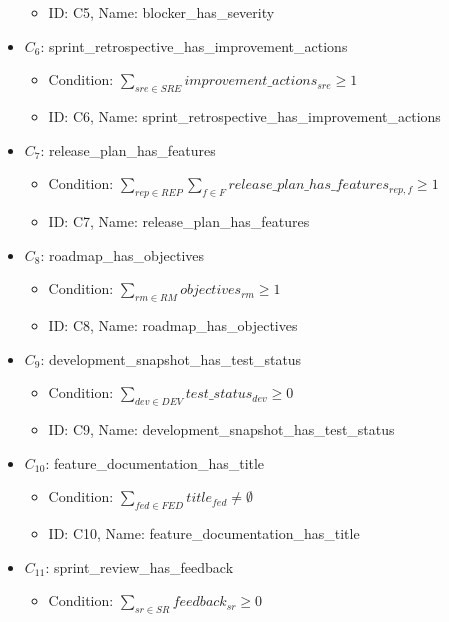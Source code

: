 \documentclass{article}
\begin{document}
\begin{itemize}
\begin{itemize}
            \item ID: C5, Name: blocker\_has\_severity
        \end{itemize}
    \item $C_6$: sprint\_retrospective\_has\_improvement\_actions
        \begin{itemize}
            \item Condition: $\sum_{sre \in SRE} improvement\_actions_{sre} \geq 1$
            \item ID: C6, Name: sprint\_retrospective\_has\_improvement\_actions
        \end{itemize}
    \item $C_7$: release\_plan\_has\_features
        \begin{itemize}
            \item Condition: $\sum_{rep \in REP} \sum_{f \in F} release\_plan\_has\_features_{rep,f} \geq 1$
            \item ID: C7, Name: release\_plan\_has\_features
        \end{itemize}
    \item $C_8$: roadmap\_has\_objectives
        \begin{itemize}
            \item Condition: $\sum_{rm \in RM} objectives_{rm} \geq 1$
            \item ID: C8, Name: roadmap\_has\_objectives
        \end{itemize}
    \item $C_9$: development\_snapshot\_has\_test\_status
        \begin{itemize}
            \item Condition: $\sum_{dev \in DEV} test\_status_{dev} \geq 0$
            \item ID: C9, Name: development\_snapshot\_has\_test\_status
        \end{itemize}
    \item $C_{10}$: feature\_documentation\_has\_title
        \begin{itemize}
            \item Condition: $\sum_{fed \in FED} title_{fed} \neq \emptyset$
            \item ID: C10, Name: feature\_documentation\_has\_title
        \end{itemize}
    \item $C_{11}$: sprint\_review\_has\_feedback
        \begin{itemize}
            \item Condition: $\sum_{sr \in SR} feedback_{sr} \geq 0$

\end{itemize}
\end{itemize}
\end{document}
